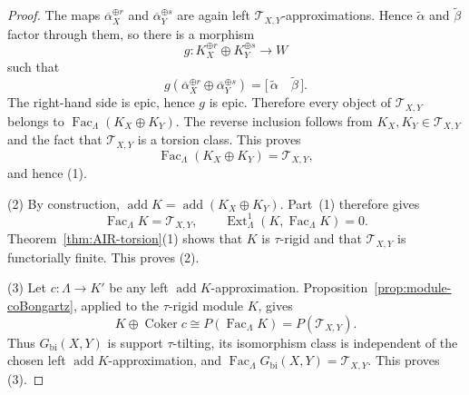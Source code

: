 \documentclass[11pt,reqno]{amsart}
\theoremstyle{definition}
\theoremstyle{remark}
\newcommand{\Fac}{\operatorname{Fac}}
\newcommand{\addc}{\operatorname{add}}
\newcommand{\Ext}{\operatorname{Ext}}
\newcommand{\Coker}{\operatorname{Coker}}
\numberwithin{equation}{section}
\begin{document}
\begin{proof}
The maps $\overline\alpha_X^{\oplus r}$ and
$\overline\alpha_Y^{\oplus s}$ are again left
$\mathcal T_{X,Y}$-approximations.  Hence $\widetilde\alpha$ and
$\widetilde\beta$ factor through them, so there is a morphism
\[
 g:K_X^{\oplus r}\oplus K_Y^{\oplus s}\longrightarrow W
\]
such that
\[
 g(\overline\alpha_X^{\oplus r}\oplus
   \overline\alpha_Y^{\oplus s})
 =\bigl[\,\widetilde\alpha\quad\widetilde\beta\,\bigr].
\]
The right-hand side is epic, hence $g$ is epic.  Therefore every object of
$\mathcal T_{X,Y}$ belongs to
$\Fac_\Lambda(K_X\oplus K_Y)$.  The reverse inclusion follows from
$K_X,K_Y\in\mathcal T_{X,Y}$ and the fact that $\mathcal T_{X,Y}$ is a
torsion class.  This proves
\[
 \Fac_\Lambda(K_X\oplus K_Y)=\mathcal T_{X,Y},
\]
and hence \textup{(1)}.

\textup{(2)} By construction,
$\addc K=\addc(K_X\oplus K_Y)$.  Part~\textup{(1)} therefore gives
\[
 \Fac_\Lambda K=\mathcal T_{X,Y},
 \qquad
 \Ext^1_\Lambda(K,\Fac_\Lambda K)=0.
\]
Theorem~\ref{thm:AIR-torsion}\textup{(1)} shows that $K$ is
$\tau$-rigid and that $\mathcal T_{X,Y}$ is functorially finite.  This
proves \textup{(2)}.

\textup{(3)} Let $c:\Lambda\to K'$ be any left
$\addc K$-approximation.  Proposition~\ref{prop:module-coBongartz}, applied
to the $\tau$-rigid module $K$, gives
\[
 K\oplus\Coker c
 \cong P(\Fac_\Lambda K)
 =P(\mathcal T_{X,Y}).
\]
Thus $G_{\mathrm{bi}}(X,Y)$ is support $\tau$-tilting, its isomorphism
class is independent of the chosen left $\addc K$-approximation, and
$\Fac_\Lambda G_{\mathrm{bi}}(X,Y)=\mathcal T_{X,Y}$.  This proves
\textup{(3)}.
\end{proof}
\end{document}
